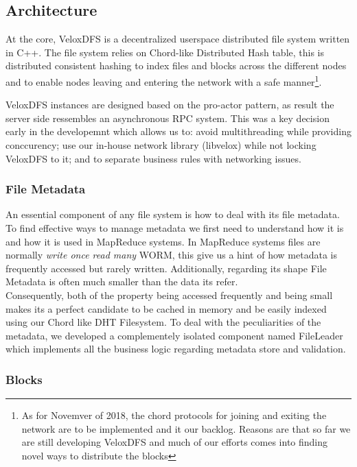 \subsection{Architecture}
At the core, VeloxDFS is a decentralized userspace distributed file system written in C++. The file system relies on Chord-like Distributed Hash table, this is distributed consistent hashing to index files and blocks across the different nodes and to enable nodes leaving and entering the network with a safe manner\footnote{As for Novemver of 2018, the chord protocols for joining and exiting the network are to be implemented and it our backlog. Reasons are that so far we are still developing VeloxDFS and much of our efforts comes into finding novel ways to distribute the blocks}.


VeloxDFS instances are designed based on the pro-actor pattern, as result the server side ressembles an asynchronous RPC system. This was a key decision early in the developemnt which allows us to: avoid multithreading while providing conccurency; use our in-house network library (libvelox) while not locking VeloxDFS to it; and to separate business rules with networking issues. \\

\subsubsection{File Metadata}
An essential component of any file system is how to deal with its file metadata. To find effective ways to manage metadata we first need to understand how it is and how it is used in MapReduce systems. In MapReduce systems files are normally \textit{write once read many} WORM, this give us a hint of how metadata is frequently accessed but rarely written. Additionally, regarding its shape File Metadata is often much smaller than the data its refer.\\ 

Consequently, both of the property being accessed frequently and being small makes its a perfect candidate to be cached in memory and be easily indexed using our Chord like DHT Filesystem. To deal with the peculiarities of the metadata, we developed a complementely isolated component named FileLeader which implements all the business logic regarding metadata store and validation. 

\subsubsection{Blocks}
\lipsum[10]
